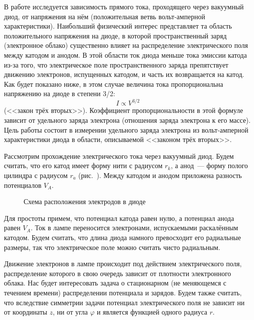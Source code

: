 \newpage
{}

В работе исследуется зависимость прямого тока, проходящего через вакуумный диод, от напряжения на нём (положительная ветвь вольт-амперной характеристики). Наибольший физический интерес представляет та область положительного напряжения на диоде, в которой пространственный заряд (электронное облако) существенно влияет на распределение электрического поля между катодом и анодом. В этой области ток диода меньше тока эмиссии катода из-за того, что электрическое поле пространственного заряда препятствует движению электронов, испущенных катодом, и часть их возвращается на катод. Как будет показано ниже, в этом случае величина тока пропорциональна напряжению на диоде в степени 3/2:
\begin{equation}
	I\propto V^{3/2}
\end{equation}
(<<закон трёх вторых>>). Коэффициент пропорциональности в этой формуле зависит от удельного заряда электрона (отношения заряда электрона к его массе). Цель работы состоит в измерении удельного заряда электрона из вольт-амперной характеристики диода в области, описываемой <<законом трёх вторых>>.

Рассмотрим прохождение электрического тока через вакуумный диод. Будем считать, что его катод имеет форму нити с
радиусом $r_k$, а анод~--- форму полого цилиндра с радиусом $r_a$ (рис.~). Между катодом и анодом приложена разность потенциалов $V_A$.
\begin{figure}[h!]
	\caption{Схема расположения электродов в диоде}
\end{figure}

Для простоты примем, что потенциал катода равен нулю, а потенциал анода равен $V_A$. Ток в лампе переносится
электронами, испускаемыми раскалённым катодом. Будем считать, что длина диода намного превосходит его радиальные
размеры, так что электрическое поле можно считать чисто радиальным.

Движение электронов в лампе происходит под действием электрического поля, распределение которого в свою очередь зависит от плотности электронного облака. Нас будет интересовать задача о стационарном (не меняющемся с течением времени) распределении потенциала и зарядов. Будем также считать, что вследствие симметрии задачи потенциал электрического поля не зависит ни от координаты $z$, ни от угла $\varphi$ и является функцией одного радиуса $r$.

